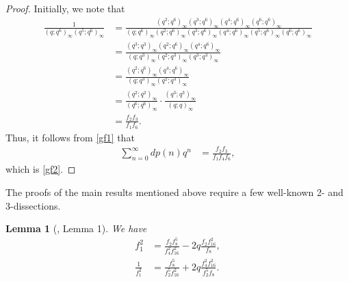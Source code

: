 \documentclass{amsart}
\newtheorem{lemma}[theorem]{Lemma}
\begin{document}
\begin{proof}
Initially, we note that
\begin{align*}
\frac{1}{(q;q^6)_\infty (q^5;q^6)_\infty} & = \frac{(q^2;q^6)_\infty(q^3;q^6)_\infty(q^4;q^6)_\infty(q^6;q^6)_\infty}{(q;q^6)_\infty(q^2;q^6)_\infty(q^3;q^6)_\infty(q^4;q^6)_\infty(q^5;q^6)_\infty(q^6;q^6)_\infty} \\
& = \frac{(q^3;q^3)_\infty(q^2;q^6)_\infty(q^4;q^6)_\infty}{(q;q^3)_\infty(q^2;q^3)_\infty(q^3;q^3)_\infty} \\
& = \frac{(q^2;q^6)_\infty(q^4;q^6)_\infty}{(q;q^3)_\infty(q^2;q^3)_\infty} \\
& = \frac{(q^2;q^2)_\infty}{(q^6;q^6)_\infty}\cdot \frac{(q^3;q^3)_\infty}{(q;q)_\infty} \\
& = \frac{f_2f_3}{f_1f_6}.  
\end{align*}
Thus, it follows from \eqref{gf1} that
\begin{align*}
 \sum_{n=0}^{\infty} dp(n)q^n 
 & = \frac{f_2f_3}{f_1f_4f_6},
\end{align*}
which is \eqref{gf2}.
\end{proof}

The proofs of the main results mentioned above require a few well-known 2- and 3-dissections.

\begin{lemma}[\cite{R}, Lemma 1]
We have
\begin{align}
{f_{1}^{2}} & =  \frac{f_{2}f_8^5}{f_{4}^{2}f_{16}^{2}} -2q\frac{f_{2}f_{16}^{2}}{f_{8}}, \label{eq1061} \\
\frac{1}{f_{1}^{2}} & =  \frac{f_{8}^{5}}{f_{2}^{5}f_{16}^{2}} + 2q\frac{f_{4}^{2}f_{16}^{2}}{f_{2}^{5}f_{8}}.   
\label{eq2}
\end{align}
\end{lemma}

\end{document}
